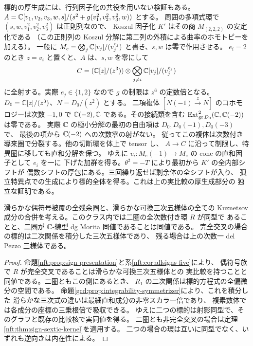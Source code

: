 標的の厚生成には、行列因子化の共役を用いない検証もある。
$A=\mathbb C[v_1,v_2,v_3,w,s]/(s^2+g(v_1^2,v_2^2,v_3^2,w))$ とする。
周囲の多項式環で $(s,w,v_1^2,v_2^2,v_3^2)$ は正則列なので、
Koszul 因子化 $K'$ はその商 $M_{(2,2,2)}$ の安定化である
（この正則列の Koszul 分解に第二列の外積による曲率のホモトピーを加える）。
一般に $M_e=\bigotimes_j \mathbb C[v_j]/(v_j^{e_j})$ と書き、$s,w$ は零で作用させる。
$e_i=2$ のとき $z=v_i$ と置くと、$A$ は、$s,w$ を零にして
\[
 C=(\mathbb C[z]/(z^3))\otimes\bigotimes_{j\ne i}\mathbb C[v_j]/(v_j^{e_j})
\]
に全射する。実際 $e_j\in\{1,2\}$ なので $g$ の制限は $z^6$ の定数倍となる。
$D_0=\mathbb C[z]/(z^3)$、$N=D_0/(z^2)$ とする。
二項複体 $[N(-1)\xrightarrow{z}N]$ のコホモロジーは次数 $-1,0$ で
$\mathbb C(-2),\mathbb C$ である。その接続類を含む
$\operatorname{Ext}^2_{\mathrm{gr}\,D_0}(\mathbb C,\mathbb C(-2))$ は零である。
実際 $\mathbb C$ の極小分解の最初の自由項は $D_0,D_0(-1),D_0(-3)$ で、
最後の項から $\mathbb C(-2)$ への次数零の射がない。
従ってこの複体は次数付き導来圏で分裂する。他の切断環を体上で tensor し、
$A\to C$ に沿って制限し、特異圏に移しても直和分解を保つ。
ゆえに $v_i:M_e(-1)\to M_e$ の cone の直和因子として $e_i$ を一に
下げた加群を得る。$\theta^2=-T$ により最初から $K'$ の全内部シフトが
偶数シフトの厚包にある。三回繰り返せば剰余体の全シフトが入り、
孤立特異点での生成により標的全体を得る。これは上の実比較の厚生成部分の
独立な証明である。

\begin{corollary}[二つの実現先の内在的判定]\label{nft:cor:sign-full-torelli}
滑らかな偶符号被覆の全残余圏と、滑らかな可換三次五様体の全ての
Kuznetsov 成分の合併を考える。このクラス内では二圏の全次数付き環 $R$ が同型で
あることと、二圏が $\mathbb C$-線型 dg Morita 同値であることは同値である。
完全交叉の場合の標的は二次関係を積分した三次五様体であり、
残る場合は上の次数一 del Pezzo 三様体である。
\end{corollary}
\begin{proof}
命題\ref{nft:prop:sign-presentation}と系\ref{nft:cor:allsigns-five}により、
偶符号族で $R$ が完全交叉であることは滑らかな可換三次五様体との
実比較を持つことと同値である。二圏ともこの側にあるとき、
$R_1$ の二次関係は標的方程式の全偏微分の空間である。
命題\ref{gcd:prop:integrability-symmetrizer}により、これを積分した
滑らかな三次式の違いは最細直和成分の非零スカラー倍であり、
複素数体では各成分の座標の三乗根倍で吸収できる。
ゆえに二つの標的は射影同型で、そのグラフと既存の比較核で実同値を得る。
二圏とも非完全交叉の場合は定理\ref{nft:thm:sign-sextic-kernel}を適用する。
二つの場合の環は互いに同型でなく、いずれも逆向きは内在性による。
\end{proof}

